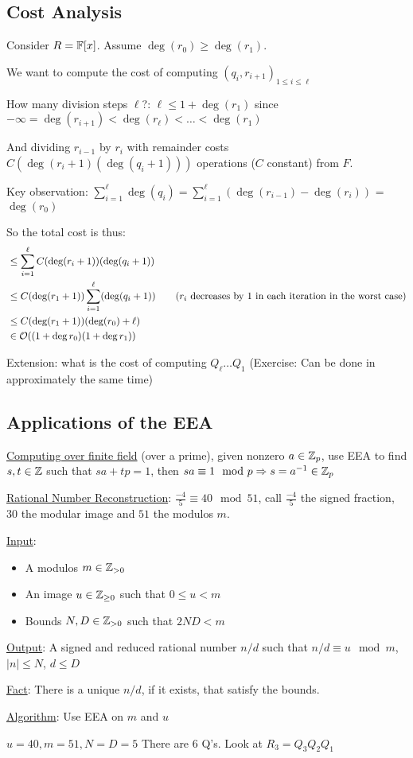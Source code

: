 \subsection{Cost Analysis}
Consider $R = \operatorname{\mathbb{F}}[x]$. Assume $\deg(r_0) \geq \deg(r_1)$.

We want to compute the cost of computing $(q_i, r_{i+1})_{1 \leq i \leq \ell}$

How many division steps $\ell$?: $\ell \leq 1 + \deg(r_1)$ since $-\infty = \deg(r_{i+1}) < \deg(r_\ell) < \ldots < \deg(r_1)$

And dividing $r_{i-1}$ by $r_i$ with remainder costs $C(\deg(r_i + 1)(\deg(q_i + 1)))$ operations ($C$ constant) from $F$.

Key observation: $\sum_{i = 1}^\ell \deg(q_i) = \sum_{i =1}^\ell \left(\deg(r_{i -1}) - \deg(r_i) \right)$ = $\deg(r_0)$

So the total cost is thus: 
\begin{align*}
    &\leq \sum_{i=1}^\ell C(\deg(r_i + 1))(\deg(q_i + 1)) \\
    &\leq C(\deg(r_1 + 1))\sum_{i=1}^\ell (\deg(q_i +1)) \quad &(r_i \text{ decreases by 1 in each iteration in the worst case}) \\
    &\leq C(\deg(r_1 + 1))(\deg(r_0) + \ell) \\
    &\in \operatorname{\mathcal{O}}((1 + \deg r_0)(1 + \deg r_1))
\end{align*}

Extension: what is the cost of computing $Q_\ell \ldots Q_1$ (Exercise: Can be done in approximately the same time)

\subsection{Applications of the EEA}
\underline{Computing over finite field} (over a prime), given nonzero $a \in \operatorname{\mathbb{Z}}_p$, use EEA to find $s,t \in \operatorname{\mathbb{Z}}$ such that $sa + tp = 1$, then $sa \equiv 1 \mod p \Rightarrow s = a^{-1} \in \operatorname{\mathbb{Z}}_p$


\underline{Rational Number Reconstruction}:
$\frac{-4}{5} \equiv 40 \mod 51$, call $\frac{-4}{5}$ the signed fraction, $30$ the modular image and $51$ the modulos $m$.

\underline{Input}:
\begin{itemize}
    \item A modulos $m \in \operatorname{\mathbb{Z}}_{> 0}$
    \item An image $u \in \operatorname{\mathbb{Z}}_{\geq 0}$ such that $0 \leq u < m$
    \item Bounds $N, D \in \operatorname{\mathbb{Z}}_{> 0}$ such that $2ND < m$
\end{itemize}

\underline{Output}: A signed and reduced rational number $n/d$ such that $n/d \equiv u \mod m$, $|n| \leq N$, $d \leq D$

\underline{Fact}: There is a unique $n/d$, if it exists, that satisfy the bounds.

\underline{Algorithm}: Use EEA on $m$ and $u$ 
\begin{example}{}{}
    $u = 40, m = 51, N = D = 5$
    There are $6$ Q's. Look at $R_3 = Q_3Q_2Q_1$

\end{example}